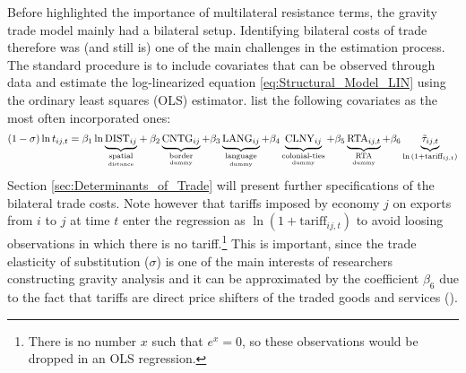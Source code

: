 Before \textcite{Anderson2003} highlighted the importance of multilateral resistance terms, the gravity trade model mainly had a bilateral setup. Identifying bilateral costs of trade therefore was (and still is) one of the main challenges in the estimation process. The standard procedure is to include covariates that can be observed through data and estimate the log-linearized equation \ref{eq:Structural_Model_LIN} using the ordinary least squares (OLS) estimator. \textcite[p. 21]{yotov2016advanced} list the following covariates as the most often incorporated ones: \begin{equation}
    \label{eq:bil_trade_costs_SGE}
    (1-\sigma) \ln{t_{ij,t}} = \beta_1 \ln{\underbrace{\text{DIST}_{ij}}_{\underset{\text{distance}}{\text{spatial}}}} + \beta_2 \underbrace{\text{CNTG}_{ij}}_{\underset{\text{dummy}}{\text{border}}} + \beta_3 \underbrace{\text{LANG}_{ij}}_{\underset{\text{dummy}}{\text{language}}} + \beta_4 \underbrace{\text{CLNY}_{ij}}_{\underset{\text{dummy}}{\text{colonial-ties}}} + \beta_5 \underbrace{\text{RTA}_{ij,t}}_{\underset{\text{dummy}}{\text{RTA}}} + \beta_6 \underbrace{\Tilde{\tau}_{ij,t}}_{\ln{(1+\text{tariff}_{ij,t})}}
\end{equation} Section \ref{sec:Determinants_of_Trade} will present further specifications of the bilateral trade costs. Note however that tariffs imposed by economy $j$ on exports from $i$ to $j$ at time $t$ enter the regression as $\ln{(1+\text{tariff}_{ij,t})}$ to avoid loosing observations in which there is no tariff.\footnote{There is no number $x$ such that $e^x=0$, so these observations would be dropped in an OLS regression.} This is important, since the trade elasticity of substitution ($\sigma$) is one of the main interests of researchers constructing gravity analysis and it can be approximated by the coefficient $\beta_6$ due to the fact that tariffs are direct price shifters of the traded goods and services (\cite[p. 21]{yotov2016advanced}).


